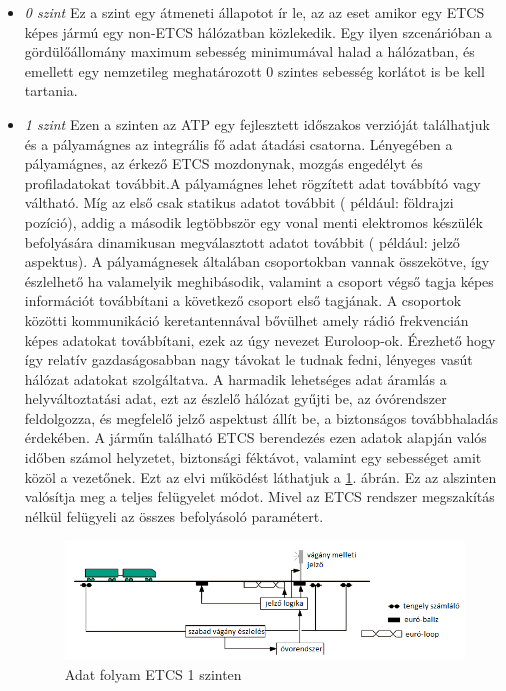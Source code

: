 \documentclass[a4paper,12pt]{article}
\begin{document}
\begin{itemize}
	\item \textit{0 szint} Ez a szint egy átmeneti állapotot ír le, az az eset amikor egy ETCS képes jármú egy non-ETCS hálózatban közlekedik.
	Egy ilyen szcenárióban a gördülőállomány maximum sebesség minimumával halad a hálózatban, és  emellett egy nemzetileg meghatározott 0 szintes sebesség korlátot is be kell tartania.	
	
	\item \textit{1 szint} Ezen a szinten az ATP egy fejlesztett időszakos verzióját találhatjuk és a pályamágnes az integrális fő adat átadási csatorna.
	Lényegében a pályamágnes, az érkező ETCS mozdonynak, mozgás engedélyt és profiladatokat továbbit.A pályamágnes lehet rögzített adat továbbító vagy váltható. 
	Míg az első csak statikus adatot továbbit ( például: földrajzi pozíció), addig  a második legtöbbször egy vonal menti elektromos készülék befolyására dinamikusan megválasztott adatot továbbit ( például: jelző aspektus).
	A pályamágnesek általában csoportokban vannak összekötve, így észlelhető ha valamelyik meghibásodik, valamint a csoport végső tagja képes információt továbbítani a következő csoport első tagjának.
	A csoportok közötti kommunikáció keretantennával bővülhet amely rádió frekvencián képes adatokat továbbítani, ezek az úgy nevezet Euroloop-ok.
	Érezhető hogy így relatív gazdaságosabban nagy távokat le tudnak fedni, lényeges vasút hálózat adatokat szolgáltatva.
	A harmadik lehetséges adat áramlás a helyváltoztatási adat, ezt az észlelő hálózat gyűjti be, az óvórendszer feldolgozza, és megfelelő jelző aspektust állít be, a biztonságos továbbhaladás érdekében.
	A járműn található ETCS berendezés ezen adatok alapján valós időben számol helyzetet, biztonsági féktávot, valamint egy sebességet amit közöl a vezetőnek.
	Ezt az elvi működést láthatjuk a \ref{fig:etcslevel1}. ábrán. Ez az alszinten valósítja meg a  teljes felügyelet módot. 
	Mivel az ETCS rendszer megszakítás nélkül felügyeli az összes befolyásoló paramétert.	
	\begin{figure}[htp]
	    \centering
	    \includegraphics[width=\linewidth]{images/etcs_level_1.png}
	    \caption[ETCS 1]{Adat folyam ETCS 1 szinten}
	    \label{fig:etcslevel1}
    \end{figure}
	

\end{itemize}
\end{document}
